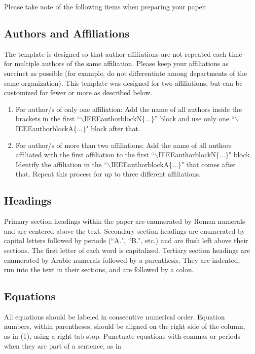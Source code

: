 \documentclass[]{NRSMRev}
\begin{document}
Please take note of the following items when preparing your paper:


\subsection{Authors and Affiliations}
The template is designed so that author affiliations are not repeated each time for multiple authors of the same affiliation. Please keep your affiliations as succinct as possible (for example, do not differentiate among departments of the same organization). This template was designed for two affiliations, but can be customized for fewer or more as described below.

\begin{enumerate}
\item For author/s of only one affiliation: Add the name of all authors inside the brackets in the first ``$\backslash$IEEEauthorblockN\{...\}'' block and use only one ``$\backslash$IEEEauthorblockA\{...\}" block after that.
\item For author/s of more than two affiliations: Add the name of all authors affiliated with the first affiliation to the first ``$\backslash$IEEEauthorblockN\{...\}" block. Identify the affiliation in the  ``$\backslash$IEEEauthorblockA\{...\}" that comes after that. Repeat this process for up to three different affiliations.
\end{enumerate}

\subsection{Headings}
Primary section headings within the paper are enumerated by Roman numerals and are centered above the text.  Secondary section headings are enumerated by capital letters followed by periods (``A.", ``B.", etc.) and are flush left above their sections. The first letter of each word is capitalized. Tertiary section headings are enumerated by Arabic numerals followed by a parenthesis. They are indented, run into the text in their sections, and are followed by a colon.

\subsection{Equations}
All equations should be labeled in consecutive numerical order. Equation numbers, within parentheses, should be aligned on the right side of the column, as in (1), using a right tab stop. Punctuate equations with commas or periods when they are part of a sentence, as in
\end{document}
